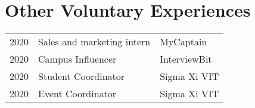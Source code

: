 \documentclass[]{deedy-resume-openfont}
\begin{document}
\begin{minipage}[t]{0.66\textwidth}

\section{Other Voluntary Experiences} 
\begin{tabular}{rll}
2020	     & Sales and marketing intern &MyCaptain  \\
2020	     & Campus Influencer &InterviewBit  \\
2020	     & Student Coordinator & Sigma Xi VIT  \\
2020	     & Event Coordinator &Sigma Xi VIT  \\

\end{tabular}


\end{minipage} 
\end{document}
